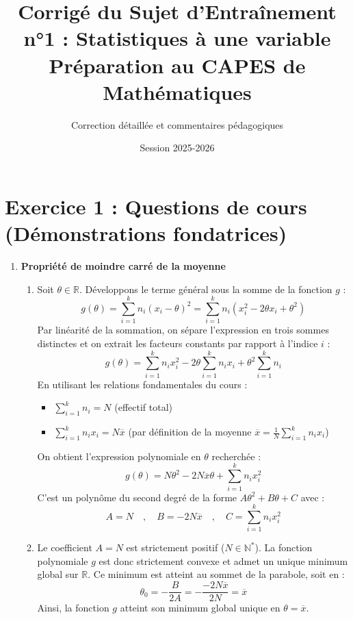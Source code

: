 \documentclass[11pt,a4paper]{article}
\title{\textbf{Corrigé du Sujet d'Entraînement n°1 : Statistiques à une variable}\\\large Préparation au CAPES de Mathématiques}
\author{Correction détaillée et commentaires pédagogiques}
\date{Session 2025-2026}
\begin{document}
\maketitle

\section*{Exercice 1 : Questions de cours (Démonstrations fondatrices)}

\begin{enumerate}
    \item \textbf{Propriété de moindre carré de la moyenne}
    \begin{enumerate}
        \item Soit $\theta \in \mathbb{R}$. Développons le terme général sous la somme de la fonction $g$ :
        \[ g(\theta) = \sum_{i=1}^{k} n_{i}(x_{i}-\theta)^{2} = \sum_{i=1}^{k} n_{i}(x_{i}^{2} - 2\theta x_{i} + \theta^{2}) \]
        Par linéarité de la sommation, on sépare l'expression en trois sommes distinctes et on extrait les facteurs constants par rapport à l'indice $i$ :
        \[ g(\theta) = \sum_{i=1}^{k} n_{i}x_{i}^{2} - 2\theta \sum_{i=1}^{k} n_{i}x_{i} + \theta^{2} \sum_{i=1}^{k} n_{i} \]
        En utilisant les relations fondamentales du cours :
        \begin{itemize}
            \item $\sum_{i=1}^{k} n_{i} = N$ (effectif total)
            \item $\sum_{i=1}^{k} n_{i}x_{i} = N\overline{x}$ (par définition de la moyenne $\overline{x} = \frac{1}{N}\sum_{i=1}^{k}n_ix_i$)
        \end{itemize}
        On obtient l'expression polynomiale en $\theta$ recherchée :
        \[ g(\theta) = N\theta^{2} - 2N\overline{x}\theta + \sum_{i=1}^{k} n_{i}x_{i}^{2} \]
        C'est un polynôme du second degré de la forme $A\theta^2 + B\theta + C$ avec :
        \[ A = N \quad , \quad B = -2N\overline{x} \quad , \quad C = \sum_{i=1}^{k} n_{i}x_{i}^{2} \]
        
        \item Le coefficient $A = N$ est strictement positif ($N \in \mathbb{N}^*$). La fonction polynomiale $g$ est donc strictement convexe et admet un unique minimum global sur $\mathbb{R}$.
        Ce minimum est atteint au sommet de la parabole, soit en :
        \[ \theta_0 = -\frac{B}{2A} = -\frac{-2N\overline{x}}{2N} = \overline{x} \]
        Ainsi, la fonction $g$ atteint son minimum global unique en $\theta = \overline{x}$.
        

\end{enumerate}
\end{enumerate}
\end{document}
